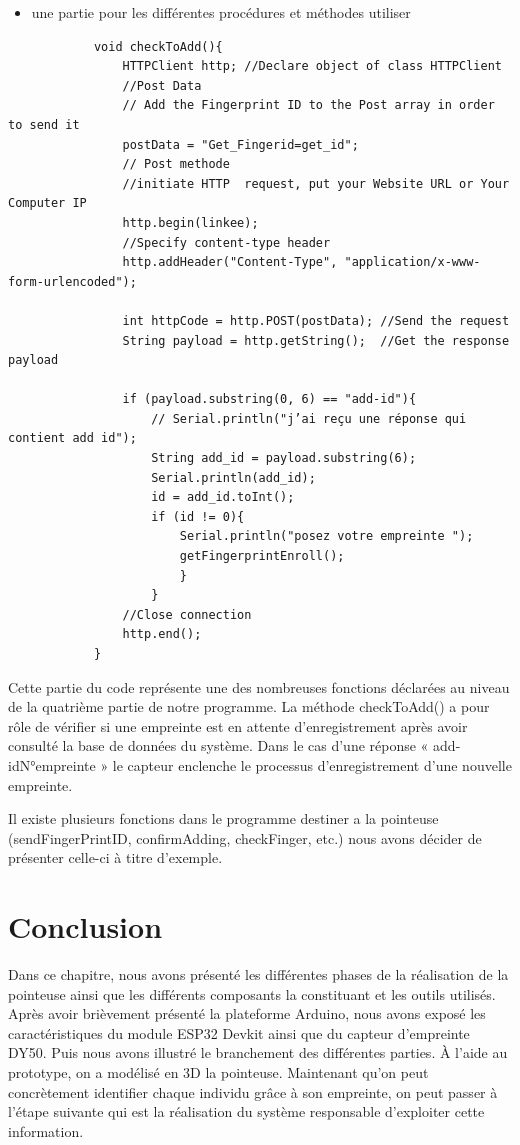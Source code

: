     \begin{itemize}
        \item[\textbullet] une partie pour les différentes procédures et méthodes utiliser 
    \end{itemize}
    \begin{verbatim}
            void checkToAdd(){
                HTTPClient http; //Declare object of class HTTPClient
                //Post Data
                // Add the Fingerprint ID to the Post array in order to send it 
                postData = "Get_Fingerid=get_id"; 
                // Post methode
                //initiate HTTP  request, put your Website URL or Your Computer IP
                http.begin(linkee);                                              
                //Specify content-type header
                http.addHeader("Content-Type", "application/x-www-form-urlencoded"); 
        
                int httpCode = http.POST(postData); //Send the request
                String payload = http.getString();  //Get the response payload
        
                if (payload.substring(0, 6) == "add-id"){
                    // Serial.println("j’ai reçu une réponse qui contient add id");
                    String add_id = payload.substring(6);
                    Serial.println(add_id);
                    id = add_id.toInt();
                    if (id != 0){
                        Serial.println("posez votre empreinte ");
                        getFingerprintEnroll();
                        }
                    }
                //Close connection
                http.end(); 
            }
    \end{verbatim}
    Cette partie du code représente une des nombreuses fonctions déclarées au niveau de la quatrième partie de notre programme. La méthode checkToAdd() a pour rôle de vérifier si une empreinte est en attente d’enregistrement après avoir consulté la base de données du système. Dans le cas d’une réponse « add-idN°empreinte » le capteur enclenche le processus d’enregistrement d’une nouvelle empreinte.

    Il existe plusieurs fonctions dans le programme destiner a la pointeuse (sendFingerPrintID, confirmAdding, checkFinger, etc.) nous avons décider de présenter celle-ci à titre d’exemple.
    
\section{Conclusion}
Dans ce chapitre, nous avons présenté les différentes phases de la réalisation de la pointeuse ainsi que les différents composants la constituant et les outils utilisés. Après avoir brièvement présenté la plateforme Arduino, nous avons exposé les caractéristiques du module ESP32 Devkit ainsi que du capteur d’empreinte DY50. Puis nous avons illustré le branchement des différentes parties. À l’aide au prototype, on a modélisé en 3D la pointeuse.
Maintenant qu’on peut concrètement identifier chaque individu grâce à son empreinte, on peut passer à l’étape suivante qui est la réalisation du système responsable d’exploiter cette information.  

